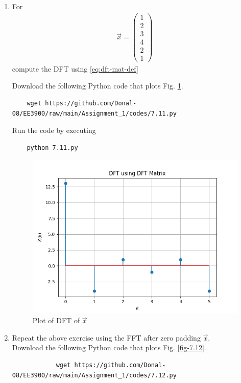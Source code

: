 \documentclass[journal,12pt,twocolumn]{IEEEtran}
\newcommand{\myvec}[1]{\ensuremath{\begin{pmatrix}#1\end{pmatrix}}}
\renewcommand\thesection{\arabic{section}}
\begin{document}
\begin{enumerate}[label=\thesection.\arabic*]
\item For 
\begin{align}
	\vec{x} = \myvec{1\\2\\3\\4\\2\\1}
	\label{eq:equation1}
\end{align}
compute the DFT  
	using 
	\eqref{eq:dft-mat-def}
	
\solution Download the following Python code that plots Fig. \ref{fig-7.11}.
\begin{lstlisting}
	wget https://github.com/Donal-08/EE3900/raw/main/Assignment_1/codes/7.11.py
\end{lstlisting}

Run the code by executing
\begin{lstlisting}
	python 7.11.py
\end{lstlisting} 
\begin{figure}[!ht]
	\centering
	\includegraphics[width=\columnwidth]{figs/7.11.png}
	\caption{Plot of DFT of $\vec{x}$}
	\label{fig-7.11}	
\end{figure}
\item Repeat the above exercise using the FFT
				after zero padding $\vec{x}$. \\
		\solution Download the following Python code that plots Fig. \ref{fig-7.12}.
		\begin{lstlisting}
			wget https://github.com/Donal-08/EE3900/raw/main/Assignment_1/codes/7.12.py
		\end{lstlisting}
		

\end{enumerate}
\end{document}
